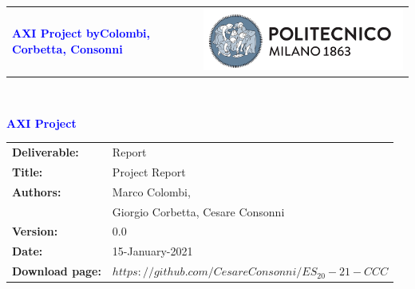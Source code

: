 




\begin{titlepage}


{\begin{table}[t!]
\centering
\begin{tabu} to \textwidth { X[1.3,r,p] X[1.7,l,p] }
\textcolor{Blue}
{\textbf{\small{AXI Project byColombi, Corbetta, Consonni}}} & \includegraphics[scale=0.5]{./../../img/Images/PolimiLogo}
\end{tabu}
\end{table}}~\\ [7cm]


\begin{flushleft}

{\textcolor{Blue}{\textbf{\Huge{AXI Project}}}} \\ [1cm]

\end{flushleft}

\end{titlepage}

\begin{table}[h!]
\begin{tabu} to \textwidth { X[0.3,r,p] X[0.7,l,p] }
\hline

\textbf{Deliverable:} & Report\\
\textbf{Title:} & Project Report \\
\textbf{Authors:} & Marco Colombi, \\ & Giorgio Corbetta, Cesare Consonni \\
\textbf{Version:} & 0.0 \\
\textbf{Date:} & 15-January-2021 \\
\textbf{Download page:} & $https://github.com/CesareConsonni/ES_20-21-CCC$ \\
\hline
\end{tabu}
\end{table}




